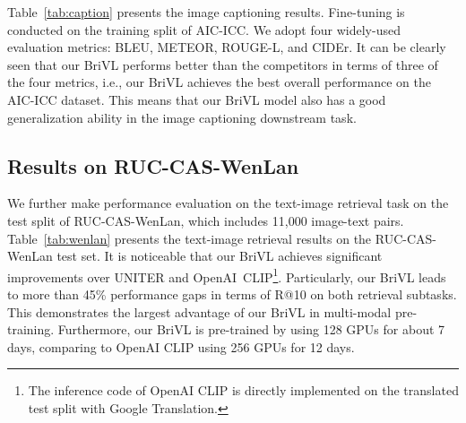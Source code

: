 \documentclass[10pt,twocolumn,letterpaper]{article}
\begin{document}
Table~\ref{tab:caption} presents the image captioning results. Fine-tuning is conducted on the training split of AIC-ICC. We adopt four widely-used evaluation metrics: BLEU, METEOR, ROUGE-L, and CIDEr. It can be clearly seen that our BriVL performs better than the competitors in terms of three of the four metrics, i.e., our BriVL achieves the best overall performance on the AIC-ICC dataset. This means that our BriVL model also has a good generalization ability in the image captioning downstream task. 

\begin{table}[t]
    \centering
    \caption{Evaluation results for the text-image retrieval downstream task on the RUC-CAS-WenLan test set.}
    \vspace{0.03in}
    \label{tab:wenlan}
    \footnotesize
\end{table}

\subsection{Results on RUC-CAS-WenLan}
\label{sec:expwenlan}

We further make performance evaluation on the text-image retrieval task on the test split of RUC-CAS-WenLan, which includes 11,000 image-text pairs. Table~\ref{tab:wenlan} presents the text-image retrieval results on the RUC-CAS-WenLan test set. It is noticeable that our BriVL achieves significant improvements over UNITER and OpenAI~CLIP\footnote{The inference code of OpenAI CLIP is directly implemented on the translated test split with Google Translation.}. Particularly, our BriVL leads to more than 45\% performance gaps in terms of R@10 on both retrieval subtasks. This demonstrates the largest advantage of our BriVL in multi-modal pre-training. Furthermore, our BriVL is pre-trained by using 128 GPUs for about 7 days, comparing to OpenAI CLIP using 256 GPUs for 12 days.
\end{document}
